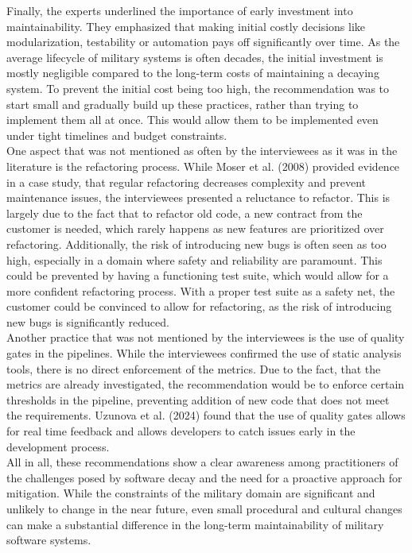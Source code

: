 Finally, the experts underlined the importance of early investment into maintainability. They emphasized that making initial costly decisions like modularization, testability or automation pays off significantly over time.
As the average lifecycle of military systems is often decades, the initial investment is mostly negligible compared to the long-term costs of maintaining a decaying system.
To prevent the initial cost being too high, the recommendation was to start small and gradually build up these practices, rather than trying to implement them all at once. This would allow them to be implemented even under tight timelines and budget constraints.\\

One aspect that was not mentioned as often by the interviewees as it was in the literature is the refactoring process. While Moser et al. (2008) provided evidence in a case study, that regular refactoring decreases complexity and prevent maintenance issues, the interviewees presented a reluctance to refactor.
This is largely due to the fact that to refactor old code, a new contract from the customer is needed, which rarely happens as new features are prioritized over refactoring. Additionally, the risk of introducing new bugs is often seen as too high, especially in a domain where safety and reliability are paramount.
This could be prevented by having a functioning test suite, which would allow for a more confident refactoring process. With a proper test suite as a safety net, the customer could be convinced to allow for refactoring, as the risk of introducing new bugs is significantly reduced.\\

Another practice that was not mentioned by the interviewees is the use of quality gates in the pipelines. While the interviewees confirmed the use of static analysis tools, there is no direct enforcement of the metrics. 
Due to the fact, that the metrics are already investigated, the recommendation would be to enforce certain thresholds in the pipeline, preventing addition of new code that does not meet the requirements. Uzunova et al. (2024) found that the use of quality gates allows for real time feedback and allows developers to catch issues early in the development process.\\

All in all, these recommendations show a clear awareness among practitioners of the challenges posed by software decay and the need for a proactive approach for mitigation. While the constraints of the military domain are significant and unlikely to change in the near future, even small procedural and 
cultural changes can make a substantial difference in the long-term maintainability of military software systems.\\

